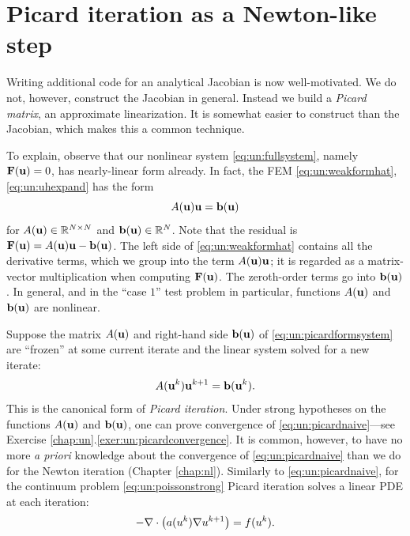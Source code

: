 \section{Picard iteration as a Newton-like step}

Writing additional code for an analytical Jacobian is now well-motivated.  We do not, however, construct the Jacobian in general.  Instead we build a \emph{Picard matrix}, an approximate linearization.  It is somewhat easier to construct than the Jacobian, which makes this a common technique.

To explain, observe that our nonlinear system \eqref{eq:un:fullsystem}, namely $\mathbf{F}(\mathbf{u})=0$, has nearly-linear form already.  In fact, the FEM \eqref{eq:un:weakformhat}, \eqref{eq:un:uhexpand} has the form
\begin{equation}
A(\mathbf{u}) \mathbf{u} = \mathbf{b}(\mathbf{u}) \label{eq:un:picardformsystem}
\end{equation}
for $A(\mathbf{u})\in\mathbb{R}^{N\times N}$ and $\mathbf{b}(\mathbf{u})\in\mathbb{R}^{N}$.  Note that the residual is $\mathbf{F}(\mathbf{u}) = A(\mathbf{u}) \mathbf{u} - \mathbf{b}(\mathbf{u})$.  The left side of \eqref{eq:un:weakformhat} contains all the derivative terms, which we group into the term $A(\mathbf{u}) \mathbf{u}$; it is regarded as a matrix-vector multiplication when computing $\mathbf{F}(\mathbf{u})$.  The zeroth-order terms go into $\mathbf{b}(\mathbf{u})$.  In general, and in the ``case $1$'' test problem in particular, functions $A(\mathbf{u})$ and $\mathbf{b}(\mathbf{u})$ are nonlinear.

Suppose the matrix $A(\mathbf{u})$ and right-hand side $\mathbf{b}(\mathbf{u})$ of \eqref{eq:un:picardformsystem} are ``frozen'' at some current iterate and the linear system solved for a new iterate:
\begin{equation}
A(\mathbf{u}^k) \mathbf{u}^{k+1} = \mathbf{b}(\mathbf{u}^k). \label{eq:un:picardnaive}
\end{equation}
This is the canonical form of \emph{Picard iteration}.  Under strong hypotheses on the functions $A(\mathbf{u})$ and $\mathbf{b}(\mathbf{u})$, one can prove convergence of \eqref{eq:un:picardnaive}---see Exercise \ref{chap:un}.\ref{exer:un:picardconvergence}.  It is common, however, to have no more \emph{a priori} knowledge about the convergence of \eqref{eq:un:picardnaive} than we do for the Newton iteration (Chapter \ref{chap:nl}).  Similarly to \eqref{eq:un:picardnaive}, for the continuum problem \eqref{eq:un:poissonstrong} Picard iteration solves a linear PDE at each iteration:
\begin{equation}
-\nabla\cdot\left(a(u^k) \nabla u^{k+1}\right) = f(u^k). \label{eq:un:picardcontinuum}
\end{equation}

